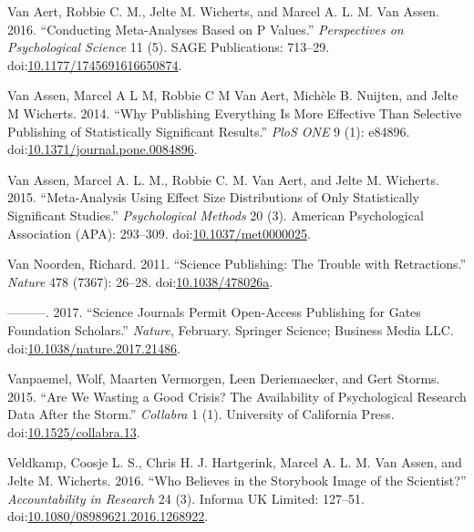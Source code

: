 \documentclass[a5paper]{book}
\begin{document}
\hypertarget{ref-doi:10.1177ux2f1745691616650874}{}
Van Aert, Robbie C. M., Jelte M. Wicherts, and Marcel A. L. M. Van
Assen. 2016. ``Conducting Meta-Analyses Based on P Values.''
\emph{Perspectives on Psychological Science} 11 (5). SAGE Publications:
713--29.
doi:\href{https://doi.org/10.1177/1745691616650874}{10.1177/1745691616650874}.

\hypertarget{ref-doi:10.1371ux2fjournal.pone.0084896}{}
Van Assen, Marcel A L M, Robbie C M Van Aert, Michèle B. Nuijten, and
Jelte M Wicherts. 2014. ``Why Publishing Everything Is More Effective
Than Selective Publishing of Statistically Significant Results.''
\emph{PloS ONE} 9 (1): e84896.
doi:\href{https://doi.org/10.1371/journal.pone.0084896}{10.1371/journal.pone.0084896}.

\hypertarget{ref-doi:10.1037ux2fmet0000025}{}
Van Assen, Marcel A. L. M., Robbie C. M. Van Aert, and Jelte M.
Wicherts. 2015. ``Meta-Analysis Using Effect Size Distributions of Only
Statistically Significant Studies.'' \emph{Psychological Methods} 20
(3). American Psychological Association (APA): 293--309.
doi:\href{https://doi.org/10.1037/met0000025}{10.1037/met0000025}.

\hypertarget{ref-doi:10.1038ux2f478026a}{}
Van Noorden, Richard. 2011. ``Science Publishing: The Trouble with
Retractions.'' \emph{Nature} 478 (7367): 26--28.
doi:\href{https://doi.org/10.1038/478026a}{10.1038/478026a}.

\hypertarget{ref-doi:10.1038ux2fnature.2017.21486}{}
---------. 2017. ``Science Journals Permit Open-Access Publishing for
Gates Foundation Scholars.'' \emph{Nature}, February. Springer Science;
Business Media LLC.
doi:\href{https://doi.org/10.1038/nature.2017.21486}{10.1038/nature.2017.21486}.

\hypertarget{ref-doi:10.1525ux2fcollabra.13}{}
Vanpaemel, Wolf, Maarten Vermorgen, Leen Deriemaecker, and Gert Storms.
2015. ``Are We Wasting a Good Crisis? The Availability of Psychological
Research Data After the Storm.'' \emph{Collabra} 1 (1). University of
California Press.
doi:\href{https://doi.org/10.1525/collabra.13}{10.1525/collabra.13}.

\hypertarget{ref-doi:10.1080ux2f08989621.2016.1268922}{}
Veldkamp, Coosje L. S., Chris H. J. Hartgerink, Marcel A. L. M. Van
Assen, and Jelte M. Wicherts. 2016. ``Who Believes in the Storybook
Image of the Scientist?'' \emph{Accountability in Research} 24 (3).
Informa UK Limited: 127--51.
doi:\href{https://doi.org/10.1080/08989621.2016.1268922}{10.1080/08989621.2016.1268922}.
\end{document}

